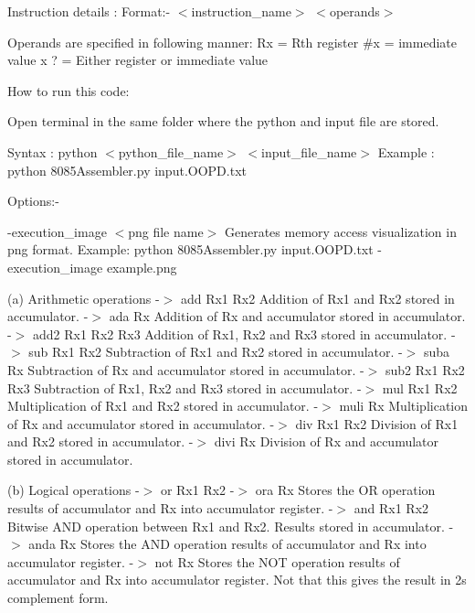 Instruction details \+: Format\+:-\/ $<$instruction\+\_\+name$>$ $<$operands$>$

Operands are specified in following manner\+: \textquotesingle{}Rx\textquotesingle{} = Rth register \textquotesingle{}\#x\textquotesingle{} = immediate value x \textquotesingle{}?\textquotesingle{} = Either register or immediate value

How to run this code\+:
\begin{DoxyEnumerate}
\item Open terminal in the same folder where the python and input file are stored.
\item Syntax \+: python $<$python\+\_\+file\+\_\+name$>$ $<$input\+\_\+file\+\_\+name$>$ Example \+: python 8085\+Assembler.\+py input.\+OOPD.\+txt
\end{DoxyEnumerate}

Options\+:-\/

-\/execution\+\_\+image $<$png file name$>$ Generates memory access visualization in png format. Example\+: python 8085\+Assembler.\+py input.\+OOPD.\+txt -\/execution\+\_\+image example.\+png

(a) Arithmetic operations -\/\texorpdfstring{$>$}{>} add Rx1 Rx2 Addition of Rx1 and Rx2 stored in accumulator. -\/\texorpdfstring{$>$}{>} ada Rx Addition of Rx and accumulator stored in accumulator. -\/\texorpdfstring{$>$}{>} add2 Rx1 Rx2 Rx3 Addition of Rx1, Rx2 and Rx3 stored in accumulator. -\/\texorpdfstring{$>$}{>} sub Rx1 Rx2 Subtraction of Rx1 and Rx2 stored in accumulator. -\/\texorpdfstring{$>$}{>} suba Rx Subtraction of Rx and accumulator stored in accumulator. -\/\texorpdfstring{$>$}{>} sub2 Rx1 Rx2 Rx3 Subtraction of Rx1, Rx2 and Rx3 stored in accumulator. -\/\texorpdfstring{$>$}{>} mul Rx1 Rx2 Multiplication of Rx1 and Rx2 stored in accumulator. -\/\texorpdfstring{$>$}{>} muli Rx Multiplication of Rx and accumulator stored in accumulator. -\/\texorpdfstring{$>$}{>} div Rx1 Rx2 Division of Rx1 and Rx2 stored in accumulator. -\/\texorpdfstring{$>$}{>} divi Rx Division of Rx and accumulator stored in accumulator.

(b) Logical operations -\/\texorpdfstring{$>$}{>} or Rx1 Rx2 -\/\texorpdfstring{$>$}{>} ora Rx Stores the OR operation results of accumulator and Rx into accumulator register. -\/\texorpdfstring{$>$}{>} and Rx1 Rx2 Bitwise AND operation between Rx1 and Rx2. Results stored in accumulator. -\/\texorpdfstring{$>$}{>} anda Rx Stores the AND operation results of accumulator and Rx into accumulator register. -\/\texorpdfstring{$>$}{>} not Rx Stores the NOT operation results of accumulator and Rx into accumulator register. Not that this gives the result in 2\textquotesingle{}s complement form.


